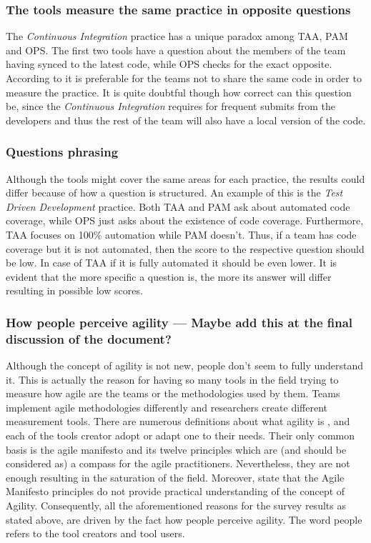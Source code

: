 \subsubsection{The tools measure the same practice in opposite questions}
The \textit{Continuous Integration} practice has a unique paradox among TAA, PAM and OPS. The first two tools have a question about the members of the team having synced to the latest code, while OPS checks for the exact opposite. According to \citet{sventha_dissertation} it is preferable for the teams not to share the same code in order to measure the practice. It is quite doubtful though how correct can this question be, since the \textit{Continuous Integration} requires for frequent submits from the developers and thus the rest of the team will also have a local version of the code.

\subsubsection{Questions phrasing}
Although the tools might cover the same areas for each practice, the results could differ because of how a question is structured. An example of this is the \textit{Test Driven Development} practice. Both TAA and PAM ask about automated code coverage, while OPS just asks about the existence of code coverage. Furthermore, TAA focuses on 100\% automation while PAM doesn’t. Thus, if a team has code coverage but it is not automated, then the score to the respective question should be low. In case of TAA if it is fully automated it should be even lower. It is evident that the more specific a question is, the more its answer will differ resulting in possible low scores.

\subsubsection{How people perceive agility --- Maybe add this at the final discussion of the document?}
Although the concept of agility is not new, people don’t seem to fully understand it. This is actually the reason for having so many tools in the field trying to measure how agile are the teams or the methodologies used by them. Teams implement agile methodologies differently and researchers create different measurement tools. There are numerous definitions about what agility is \cite{Kidd, NagelDove, Kara, Ramesh}, and each of the tools creator adopt or adapt one to their needs. Their only common basis is the agile manifesto \cite{beck2001agile} and its twelve principles \cite{agile_principles} which are (and should be considered as) a compass for the agile practitioners. Nevertheless, they are not enough resulting in the saturation of the field. Moreover, \citet{conboy_fitzgerald} state that the Agile Manifesto principles do not provide practical understanding of the concept of Agility. Consequently, all the aforementioned reasons for the survey results as stated above, are driven by the fact how people perceive agility. The word people refers to the tool creators and tool users.

